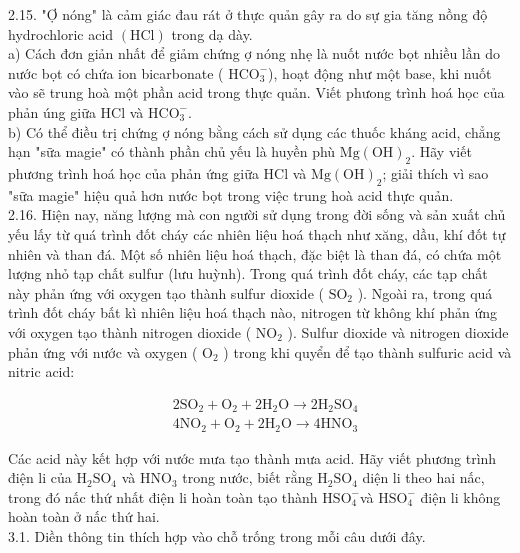 \documentclass[10pt]{article}
\begin{document}
2.15. "Ợ nóng" là cảm giác đau rát ở thực quản gây ra do sự gia tăng nồng độ hydrochloric acid $(\mathrm{HCl})$ trong dạ dày.\\
a) Cách đơn giản nhất để giảm chứng ợ nóng nhẹ là nuốt nước bọt nhiều lần do nước bọt có chứa ion bicarbonate ( $\mathrm{HCO}_{3}^{-}$), hoạt động như một base, khi nuốt vào sẽ trung hoà một phần acid trong thực quản. Viết phưong trình hoá học của phản úng giữa HCl và $\mathrm{HCO}_{3}^{-}$.\\
b) Có thể điều trị chứng ợ nóng bằng cách sử dụng các thuốc kháng acid, chẳng hạn "sữa magie" có thành phần chủ yếu là huyền phù $\mathrm{Mg}(\mathrm{OH})_{2}$. Hãy viết phương trình hoá học của phản ứng giữa HCl và $\mathrm{Mg}(\mathrm{OH})_{2}$; giải thích vì sao "sữa magie" hiệu quả hơn nước bọt trong việc trung hoà acid thực quản.\\
2.16. Hiện nay, năng lượng mà con người sử dụng trong đời sống và sản xuất chủ yếu lấy từ quá trình đốt cháy các nhiên liệu hoá thạch như xăng, dầu, khí đốt tự nhiên và than đá. Một số nhiên liệu hoá thạch, đặc biệt là than đá, có chứa một lượng nhỏ tạp chất sulfur (lưu huỳnh). Trong quá trình đốt cháy, các tạp chất này phản ứng với oxygen tạo thành sulfur dioxide ( $\mathrm{SO}_{2}$ ). Ngoài ra, trong quá trình đốt cháy bất kì nhiên liệu hoá thạch nào, nitrogen từ không khí phản ứng với oxygen tạo thành nitrogen dioxide ( $\mathrm{NO}_{2}$ ). Sulfur dioxide và nitrogen dioxide phản ứng với nước và oxygen ( $\mathrm{O}_{2}$ ) trong khi quyển để tạo thành sulfuric acid và nitric acid:

$$
\begin{aligned}
& 2 \mathrm{SO}_{2}+\mathrm{O}_{2}+2 \mathrm{H}_{2} \mathrm{O} \rightarrow 2 \mathrm{H}_{2} \mathrm{SO}_{4} \\
& 4 \mathrm{NO}_{2}+\mathrm{O}_{2}+2 \mathrm{H}_{2} \mathrm{O} \rightarrow 4 \mathrm{HNO}_{3}
\end{aligned}
$$

Các acid này kết hợp với nước mưa tạo thành mưa acid. Hãy viết phương trình điện li của $\mathrm{H}_{2} \mathrm{SO}_{4}$ và $\mathrm{HNO}_{3}$ trong nước, biết rằng $\mathrm{H}_{2} \mathrm{SO}_{4}$ diện li theo hai nấc, trong đó nấc thứ nhất điện li hoàn toàn tạo thành $\mathrm{HSO}_{4}^{-}$và $\mathrm{HSO}_{4}^{-}$ điện li không hoàn toàn ở nấc thứ hai.\\
3.1. Diền thông tin thích hợp vào chỗ trống trong mỗi câu dưới đây.
\end{document}
